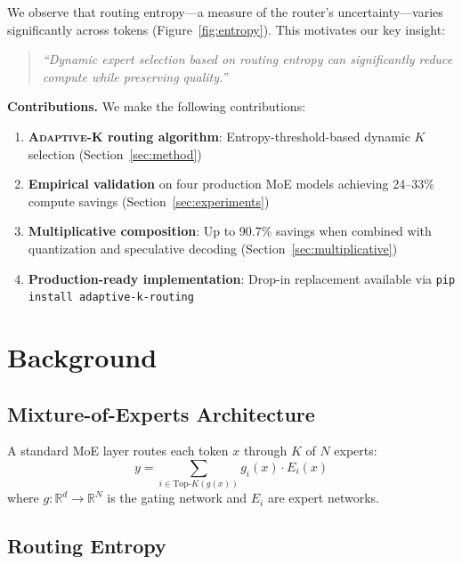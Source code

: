 \documentclass{article}
\newcommand{\adaptivek}{\textsc{Adaptive-K}}
\newcommand{\R}{\mathbb{R}}
\begin{document}
We observe that routing entropy---a measure of the router's uncertainty---varies significantly across tokens (Figure~\ref{fig:entropy}). This motivates our key insight:

\begin{quote}
\textit{``Dynamic expert selection based on routing entropy can significantly reduce compute while preserving quality.''}
\end{quote}

\textbf{Contributions.} We make the following contributions:
\begin{enumerate}
    \item \textbf{\adaptivek{} routing algorithm}: Entropy-threshold-based dynamic $K$ selection (Section~\ref{sec:method})
    \item \textbf{Empirical validation} on four production MoE models achieving 24--33\% compute savings (Section~\ref{sec:experiments})
    \item \textbf{Multiplicative composition}: Up to 90.7\% savings when combined with quantization and speculative decoding (Section~\ref{sec:multiplicative})
    \item \textbf{Production-ready implementation}: Drop-in replacement available via \texttt{pip install adaptive-k-routing}
\end{enumerate}

\section{Background}
\label{sec:background}

\subsection{Mixture-of-Experts Architecture}

A standard MoE layer routes each token $x$ through $K$ of $N$ experts:
\begin{equation}
y = \sum_{i \in \text{Top-}K(g(x))} g_i(x) \cdot E_i(x)
\label{eq:moe}
\end{equation}
where $g: \R^d \rightarrow \R^N$ is the gating network and $E_i$ are expert networks.

\subsection{Routing Entropy}
\end{document}
